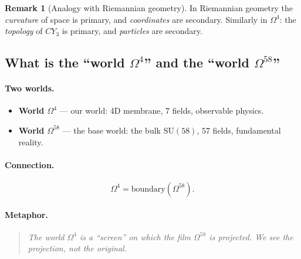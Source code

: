 \documentclass[11pt,a4paper]{article}
\newcommand{\SU}{\mathrm{SU}}
\newcommand{\CY}{CY_3}
\newcommand{\Om}{\Omega^4}
\newcommand{\Omfi}{\Omega^{58}}
\theoremstyle{definition}
\newtheorem{remark}[theorem]{Remark}
\begin{document}
\begin{remark}[Analogy with Riemannian geometry]
\label{rem:riemann-analogy}
In Riemannian geometry the \emph{curvature} of space is primary, 
and \emph{coordinates} are secondary. Similarly in $\Om$: 
the \emph{topology} of $\CY$ is primary, and \emph{particles} are secondary.
\end{remark}

\subsection{What is the ``world $\Om$'' and the ``world $\Omfi$''}
\label{subsec:worlds-philosophy}

\paragraph{Two worlds.}

\begin{itemize}
    \item \textbf{World $\Om$} — our world: 4D membrane, $7$ fields, 
          observable physics.
    \item \textbf{World $\Omfi$} — the base world: the bulk $\SU(58)$, 
          $57$ fields, fundamental reality.
\end{itemize}

\paragraph{Connection.}
\begin{equation}
    \Om = \text{boundary}(\Omfi).
\end{equation}

\paragraph{Metaphor.}
\begin{quote}
\itshape
The world $\Om$ is a ``screen'' on which the film $\Omfi$ is projected. 
We see the \emph{projection}, not the \emph{original}.
\end{quote}
\end{document}
